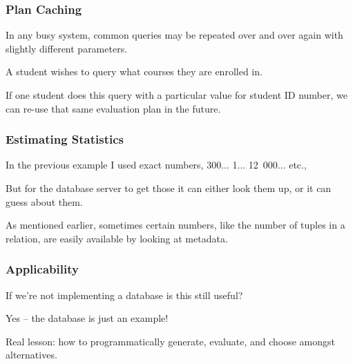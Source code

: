 \begin{frame}
\frametitle{Plan Caching}

In any busy system, common queries may be repeated over and over again with slightly different parameters. 

A student wishes to query what courses they are enrolled in. 

If one student does this query with a particular value for student ID number, we can re-use that same evaluation plan in the future.

\end{frame}


\begin{frame}
\frametitle{Estimating Statistics}

In the previous example I used exact numbers, 300... 1... 12~000... etc.,

But for the database server to get those it can either look them up, or it can guess about them. 

As mentioned earlier, sometimes certain numbers, like the number of tuples in a relation, are easily available by looking at metadata. 

\end{frame}


\begin{frame}
\frametitle{Applicability}

If we're not implementing a database is this still useful?

Yes -- the database is just an example!

Real lesson: how to programmatically generate, evaluate, and choose amongst alternatives.

\end{frame}




